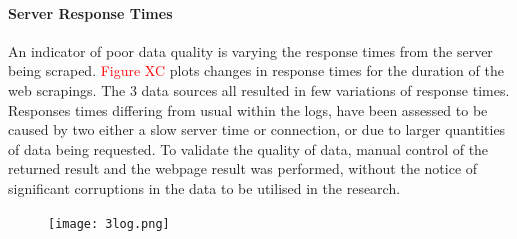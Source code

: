 \documentclass[12pt,a4paper]{article}
\begin{document}
\paragraph{Server Response Times\newline}
An indicator of poor data quality is varying the response times from the server being scraped. \textcolor{red}{Figure XC} plots changes in response times for the duration of the web scrapings. The 3 data sources all resulted in few variations of response times.  Responses times differing from usual within the logs, have been assessed to be caused by two either a slow server time or connection, or due to larger quantities of data being requested. To validate the quality of data, manual control of the returned result and the webpage result was performed, without the notice of significant corruptions in the data to be utilised in the research.
\begin{figure}[H]
  \centering
   \caption{}
   \texttt{[image: 3log.png]} 
  \label{fig:}
\end{figure}
\end{document}

